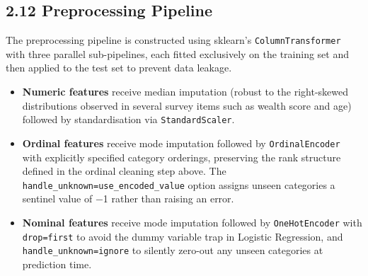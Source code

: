 \documentclass[11pt]{article}
\providecommand{\tightlist}{%
      \setlength{\itemsep}{0pt}\setlength{\parskip}{0pt}}
\begin{document}
    \hypertarget{preprocessing-pipeline}{%
\subsection{2.12 Preprocessing Pipeline}\label{preprocessing-pipeline}}

The preprocessing pipeline is constructed using sklearn's
\texttt{ColumnTransformer} with three parallel sub-pipelines, each
fitted exclusively on the training set and then applied to the test set
to prevent data leakage.

\begin{itemize}
\tightlist
\item
  \textbf{Numeric features} receive median imputation (robust to the
  right-skewed distributions observed in several survey items such as
  wealth score and age) followed by standardisation via
  \texttt{StandardScaler}.
\item
  \textbf{Ordinal features} receive mode imputation followed by
  \texttt{OrdinalEncoder} with explicitly specified category orderings,
  preserving the rank structure defined in the ordinal cleaning step
  above. The
  \texttt{handle\_unknown=\textquotesingle{}use\_encoded\_value\textquotesingle{}}
  option assigns unseen categories a sentinel value of −1 rather than
  raising an error.
\item
  \textbf{Nominal features} receive mode imputation followed by
  \texttt{OneHotEncoder} with
  \texttt{drop=\textquotesingle{}first\textquotesingle{}} to avoid the
  dummy variable trap in Logistic Regression, and
  \texttt{handle\_unknown=\textquotesingle{}ignore\textquotesingle{}} to
  silently zero-out any unseen categories at prediction time.
\end{itemize}
\end{document}
